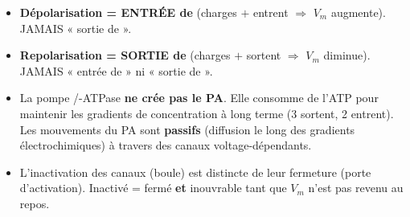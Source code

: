 \documentclass[11pt]{article}
\begin{document}
\begin{attention}
\begin{itemize}
\item \textbf{Dépolarisation = ENTRÉE de } (charges $+$ entrent $\Rightarrow$ $V_m$ augmente). JAMAIS « sortie de  ».
\item \textbf{Repolarisation = SORTIE de } (charges $+$ sortent $\Rightarrow$ $V_m$ diminue). JAMAIS « entrée de  » ni « sortie de  ».
\item La pompe /-ATPase \textbf{ne crée pas le PA}. Elle consomme de l'ATP pour maintenir les gradients de concentration à long terme (3  sortent, 2  entrent). Les mouvements du PA sont \textbf{passifs} (diffusion le long des gradients électrochimiques) à travers des canaux voltage-dépendants.
\item L'inactivation des canaux  (boule) est distincte de leur fermeture (porte d'activation). Inactivé = fermé \textbf{et} inouvrable tant que $V_m$ n'est pas revenu au repos.
\end{itemize}
\end{attention}
\end{document}
